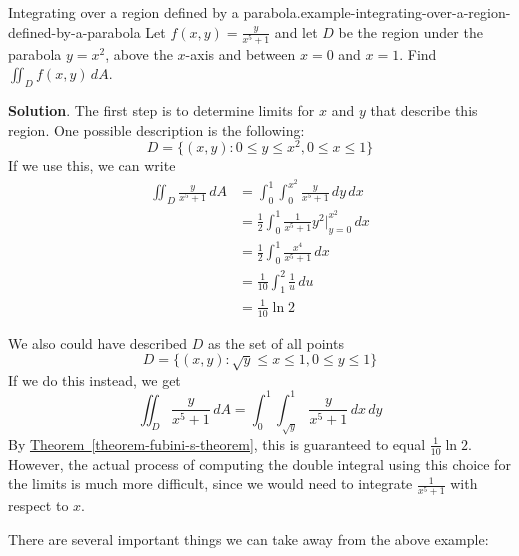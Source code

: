 \documentclass[10pt,]{book}
\numberwithin{equation}{section}
\begin{document}
\begin{example}{Integrating over a region defined by a parabola.}{example-integrating-over-a-region-defined-by-a-parabola}%
\hypertarget{p-1472}{}%
Let \(f(x,y) = \frac{y}{x^{5}+1}\) and let \(D\) be the region under the parabola \(y = x^{2}\), above the \(x\)-axis and between \(x=0\) and \(x=1\). Find \(\iint_{D}f(x,y)\,dA\).%
\par\smallskip%
\noindent\textbf{Solution}.\hypertarget{solution-241}{}\quad%
\hypertarget{p-1473}{}%
The first step is to determine limits for \(x\) and \(y\) that describe this region. One possible description is the following:%
\begin{equation*}
D = \{(x,y) : 0\leq y\leq x^{2}, 0\leq x\leq 1\}
\end{equation*}
If we use this, we can write%
\begin{align*}
\iint_{D}\frac{y}{x^{5}+1}\,dA & = \int_{0}^{1}\int_{0}^{x^{2}}\frac{y}{x^{5}+1}\,dy\,dx \\
& = \frac{1}{2}\int_{0}^{1}\frac{1}{x^{5}+1}y^{2}\bigg|_{y=0}^{x^{2}}\,dx \\
& = \frac{1}{2}\int_{0}^{1}\frac{x^{4}}{x^{5}+1}\,dx \\
& = \frac{1}{10}\int_{1}^{2}\frac{1}{u}\,du \\
& =  \frac{1}{10}\ln2
\end{align*}
%
\par
\hypertarget{p-1474}{}%
We also could have described \(D\) as the set of all points%
\begin{equation*}
D = \{(x,y) : \sqrt{y} \leq x\leq 1, 0\leq y\leq 1\}
\end{equation*}
If we do this instead, we get%
\begin{equation*}
\iint_{D}\frac{y}{x^{5}+1}\,dA = \int_{0}^{1}\int_{\sqrt{y}}^{1}\frac{y}{x^{5}+1}\,dx\,dy 
\end{equation*}
By \hyperref[theorem-fubini-s-theorem]{Theorem~\ref{theorem-fubini-s-theorem}}, this is guaranteed to equal \(\frac{1}{10}\ln2\). However, the actual process of computing the double integral using this choice for the limits is much more difficult, since we would need to integrate \(\frac{1}{x^{5}+1}\) with respect to \(x\).%
\end{example}
\hypertarget{p-1475}{}%
There are several important things we can take away from the above example: \leavevmode%
\end{document}
